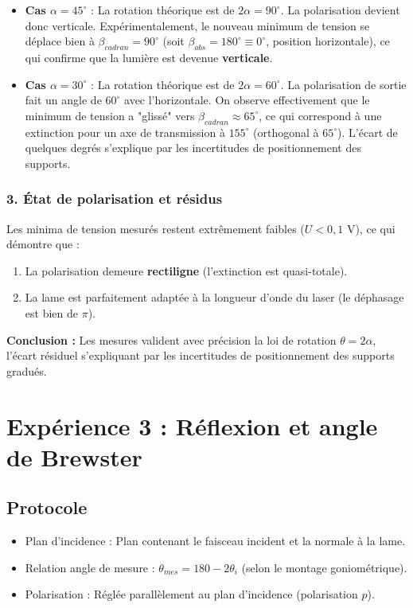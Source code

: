 \documentclass[a4paper,9pt,french]{scrartcl}
\begin{document}
\begin{itemize}
    \item \textbf{Cas $\alpha = 45^\circ$} : La rotation théorique est de $2\alpha = 90^\circ$. La polarisation devient donc verticale. Expérimentalement, le nouveau minimum de tension se déplace bien à $\beta_{cadran} = 90^\circ$ (soit $\beta_{abs} = 180^\circ \equiv 0^\circ$, position horizontale), ce qui confirme que la lumière est devenue \textbf{verticale}.
    \item \textbf{Cas $\alpha = 30^\circ$} : La rotation théorique est de $2\alpha = 60^\circ$. La polarisation de sortie fait un angle de $60^\circ$ avec l'horizontale. On observe effectivement que le minimum de tension a "glissé" vers $\beta_{cadran} \approx 65^\circ$, ce qui correspond à une extinction pour un axe de transmission à $155^\circ$ (orthogonal à $65^\circ$). L'écart de quelques degrés s'explique par les incertitudes de positionnement des supports.
\end{itemize}



\subsubsection*{3. État de polarisation et résidus}
Les minima de tension mesurés restent extrêmement faibles ($U < 0,1$ V), ce qui démontre que :
\begin{enumerate}
    \item La polarisation demeure \textbf{rectiligne} (l'extinction est quasi-totale).
    \item La lame est parfaitement adaptée à la longueur d'onde du laser (le déphasage est bien de $\pi$).
\end{enumerate}

\textbf{Conclusion :} Les mesures valident avec précision la loi de rotation $\theta = 2\alpha$, l'écart résiduel s'expliquant par les incertitudes de positionnement des supports gradués.
\section{Expérience 3 : Réflexion et angle de Brewster}
\subsection{Protocole}
\begin{itemize}
    \item Plan d'incidence : Plan contenant le faisceau incident et la normale à la lame.
    \item Relation angle de mesure : $\theta_{mes} = 180 - 2\theta_i$ (selon le montage goniométrique).
    \item Polarisation : Réglée parallèlement au plan d'incidence (polarisation $p$).
\end{itemize}
\end{document}
